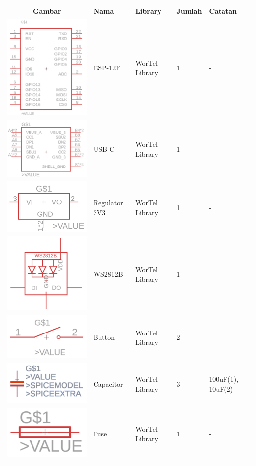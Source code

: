 \begin{enumerate}
\begin{table}[ht]
\begin{center}
        \begin{tabular}{|c|p{2cm}|m{2cm}|m{2cm}|m{2cm}|}
            \hline
            Gambar & Nama & Library & Jumlah & Catatan \\
            \hline
            \includegraphics[width=0.05\linewidth]{P2/img/ESP-12F_2.png} & {\fontsize{8}{6}\selectfont ESP-12F} & {\fontsize{8}{6}\selectfont WorTel Library} & 1 &  - \\
            \hline
            \includegraphics[width=0.05\linewidth]{P2/img/USB-C_2.png} & {\fontsize{8}{6}\selectfont USB-C} &  {\fontsize{8}{6}\selectfont WorTel Library} & 1 & - \\
            \hline
            \includegraphics[width=0.05\linewidth]{P2/img/Regulator_3V3_2.png} & {\fontsize{8}{6}\selectfont Regulator 3V3} &  {\fontsize{8}{6}\selectfont WorTel Library} & 1 & - \\
            \hline
            \includegraphics[width=0.1\linewidth]{P2/img/WS2812B_2.png} & {\fontsize{8}{6}\selectfont WS2812B} &  {\fontsize{8}{6}\selectfont WorTel Library} & 1 & - \\
            \hline
            \includegraphics[width=0.1\linewidth]{P2/img/Button_2.png} & {\fontsize{8}{6}\selectfont Button} &  {\fontsize{8}{6}\selectfont WorTel Library} & 2 & - \\
            \hline
            \includegraphics[width=0.1\linewidth]{P2/img/Capacitor_2.png} & {\fontsize{8}{6}\selectfont Capacitor} &  {\fontsize{8}{6}\selectfont WorTel Library} & 3 & {\fontsize{8}{6}\selectfont 100uF(1), 10uF(2)} \\
            \hline
            \includegraphics[width=0.1\linewidth]{P2/img/Fuse_2.png} & {\fontsize{8}{6}\selectfont Fuse} &  {\fontsize{8}{6}\selectfont WorTel Library} & 1 & - \\

\end{tabular}
\end{center}
\end{table}
\end{enumerate}
